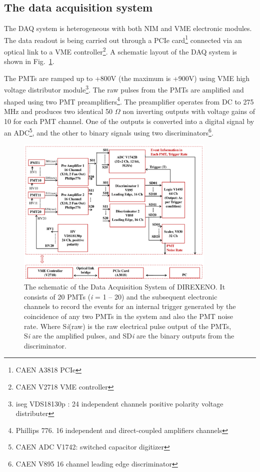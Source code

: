 \subsection{The data acquisition system }
\label{sec:DAQ}


The DAQ system is heterogeneous with both 
NIM and VME electronic modules. The data readout is being carried out through a PCIe card\footnote{CAEN A3818 PCIe} 
connected via an optical link to a VME controller\footnote{CAEN V2718 VME controller}. A schematic layout of the DAQ system is shown in Fig.~{\ref{Fig:DAQscheme}}. 


The PMTs are ramped up to +800V (the maximum is +900V) using VME high voltage distributor module\footnote{iseg VDS18130p : 
24 independent channels positive polarity voltage distributer}. The raw pulses from the PMTs are amplified and shaped using 
two PMT preamplifiers\footnote{Phillips 776. 16 independent and direct-coupled amplifiers channels}. The preamplifier operates 
from DC to 275 MHz and produces two identical 50 $\Omega$ non inverting outputs with voltage gains of 10 for each PMT channel. One 
of the outputs is converted into a digital signal by an ADC\footnote{CAEN ADC V1742: switched capacitor digitizer}, and the other to 
binary signals using two discriminators\footnote{CAEN V895 16 channel leading edge discriminator}.

\begin{figure}[h]
   \centering
   \includegraphics[width=0.85\textwidth]{DAQscheme.pdf}
   \caption{The schematic of the Data Acquisition System of DIREXENO. It 
        consists of 20 PMTs ({\it i} = 1 -- 20) and the subsequent electronic channels to record 
        the events for an internal trigger generated by the coincidence of any 
        two PMTs in the system and also the PMT noise rate. Where S{\it i}(raw) is the raw electrical pulse output of the PMTs, S{\it i} are 
        the amplified pulses, and SD{\it i} are the binary outputs from the discriminator. 
}
   \label{Fig:DAQscheme}
\end{figure}

